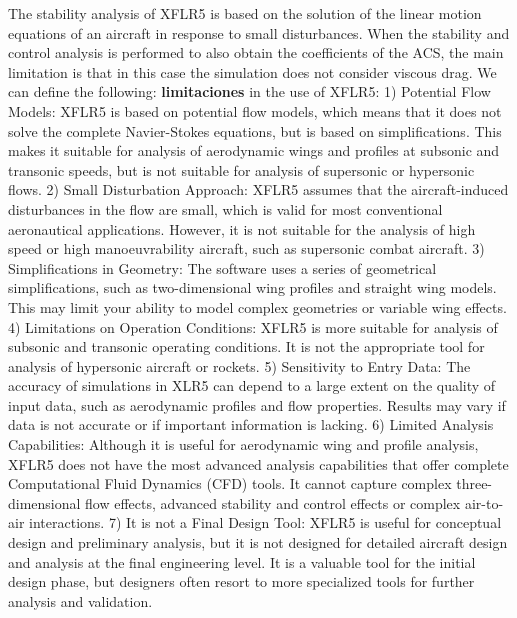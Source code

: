 The stability analysis of XFLR5 is based on the solution of the linear motion equations of an aircraft in response to small disturbances. When the stability and control analysis is performed to also obtain the coefficients of the ACS, the main limitation is that in this case the simulation does not consider viscous drag. We can define the following: \textbf{limitaciones} in the use of XFLR5:
%
1) Potential Flow Models: XFLR5 is based on potential flow models, which means that it does not solve the complete Navier-Stokes equations, but is based on simplifications. This makes it suitable for analysis of aerodynamic wings and profiles at subsonic and transonic speeds, but is not suitable for analysis of supersonic or hypersonic flows.
%
2) Small Disturbation Approach: XFLR5 assumes that the aircraft-induced disturbances in the flow are small, which is valid for most conventional aeronautical applications. However, it is not suitable for the analysis of high speed or high manoeuvrability aircraft, such as supersonic combat aircraft.
%
3) Simplifications in Geometry: The software uses a series of geometrical simplifications, such as two-dimensional wing profiles and straight wing models. This may limit your ability to model complex geometries or variable wing effects. 
%
4) Limitations on Operation Conditions: XFLR5 is more suitable for analysis of subsonic and transonic operating conditions. It is not the appropriate tool for analysis of hypersonic aircraft or rockets.
%
5) Sensitivity to Entry Data: The accuracy of simulations in XLR5 can depend to a large extent on the quality of input data, such as aerodynamic profiles and flow properties. Results may vary if data is not accurate or if important information is lacking.
%
6) Limited Analysis Capabilities: Although it is useful for aerodynamic wing and profile analysis, XFLR5 does not have the most advanced analysis capabilities that offer complete Computational Fluid Dynamics (CFD) tools. It cannot capture complex three-dimensional flow effects, advanced stability and control effects or complex air-to-air interactions.
%
7) It is not a Final Design Tool: XFLR5 is useful for conceptual design and preliminary analysis, but it is not designed for detailed aircraft design and analysis at the final engineering level. It is a valuable tool for the initial design phase, but designers often resort to more specialized tools for further analysis and validation. 
%
